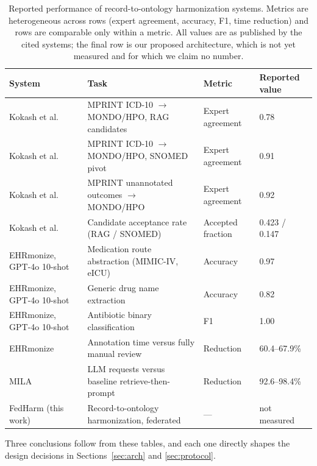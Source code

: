 \documentclass[conference]{IEEEtran}
\begin{document}
\begin{table}[t]
\caption{Reported performance of record-to-ontology harmonization systems. Metrics are heterogeneous across rows (expert agreement, accuracy, F1, time reduction) and rows are comparable only within a metric. All values are as published by the cited systems; the final row is our proposed architecture, which is not yet measured and for which we claim no number.}
\label{tab:reported}
\centering
\footnotesize
\begin{tabular}{@{}llll@{}}
\toprule
\textbf{System} & \textbf{Task} & \textbf{Metric} & \textbf{Reported value} \\
\midrule
Kokash et al.~\cite{b1} & MPRINT ICD-10 $\rightarrow$ MONDO/HPO, RAG candidates & Expert agreement & 0.78 \\
Kokash et al.~\cite{b1} & MPRINT ICD-10 $\rightarrow$ MONDO/HPO, SNOMED pivot & Expert agreement & 0.91 \\
Kokash et al.~\cite{b1} & MPRINT unannotated outcomes $\rightarrow$ MONDO/HPO & Expert agreement & 0.92 \\
Kokash et al.~\cite{b1} & Candidate acceptance rate (RAG / SNOMED) & Accepted fraction & 0.423 / 0.147 \\
EHRmonize, GPT-4o 10-shot~\cite{b40} & Medication route abstraction (MIMIC-IV, eICU) & Accuracy & 0.97 \\
EHRmonize, GPT-4o 10-shot~\cite{b40} & Generic drug name extraction & Accuracy & 0.82 \\
EHRmonize, GPT-4o 10-shot~\cite{b40} & Antibiotic binary classification & F1 & 1.00 \\
EHRmonize~\cite{b40} & Annotation time versus fully manual review & Reduction & 60.4--67.9\% \\
MILA~\cite{b54} & LLM requests versus baseline retrieve-then-prompt & Reduction & 92.6--98.4\% \\
\midrule
FedHarm (this work) & Record-to-ontology harmonization, federated & --- & not measured \\
\bottomrule
\end{tabular}
\end{table}

Three conclusions follow from these tables, and each one directly shapes the design decisions in Sections~\ref{sec:arch} and \ref{sec:protocol}.
\end{document}
